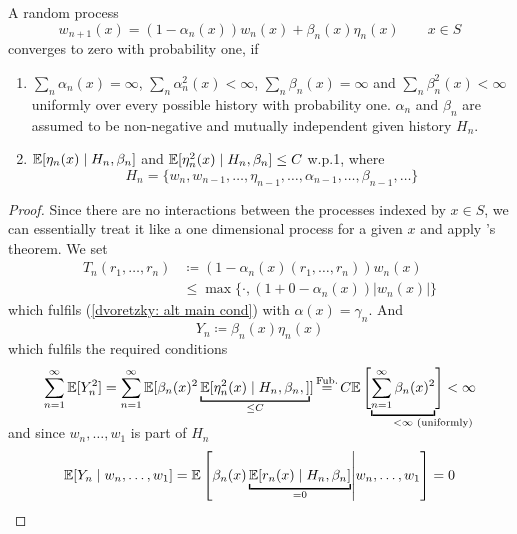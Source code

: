 \begin{lemma}
    A random process
    \[
        w_{n+1}(x)=(1-\alpha_n(x))w_n(x) +\beta_n(x)\eta_n(x) \qquad x\in S
    \]
    converges to zero with probability one, if 
    \begin{enumerate}
        \item \(\sum_n \alpha_n(x)=\infty\), \(\sum_n \alpha_n^2(x) <\infty\), \(\sum_n\beta_n(x)=\infty\) and \(\sum_n \beta_n^2 (x)<\infty\) uniformly over every possible history with probability one. \(\alpha_n\) and \(\beta_n\) are assumed to be non-negative and mutually independent given history \(H_n\).
        \item \(\mathbb{E}[\eta_n(x)\mid H_n, \beta_n]  \) and \( \mathbb{E}[\eta_n^2(x)\mid H_n,\beta_n]\le C \) w.p.1, where 
        \[
            H_n=\{w_n, w_{n-1}, \dots, \eta_{n-1}, \dots, \alpha_{n-1},\dots, \beta_{n-1},\dots\}
        \]
    \end{enumerate}
\end{lemma}
\begin{proof}
    Since there are no interactions between the processes indexed by \(x\in S\), we can essentially treat it like a one dimensional process for a given \(x\) and apply \citeauthor{dvoretzkyStochasticApproximation1956}'s theorem. 
    We set
    \begin{align}
        T_n(r_1,\dots, r_n)
        &\coloneqq (1-\alpha_n(x)(r_1,\dots,r_n)) w_n(x) \\
        &\le \max\{\cdot, (1+ 0 -\alpha_n(x))|w_n(x)|\}
    \end{align}
    which fulfils (\ref{dvoretzky: alt main cond}) with \(\alpha(x)=\gamma_n\). And
    \[
       Y_n\coloneqq \beta_n(x) \eta_n(x)
    \]
    which fulfils the required conditions
    \[
        \sum_{n=1}^\infty \E[Y_n^2] 
        = \sum_{n=1}^\infty \E[\beta_n(x)^2\underbracket[1pt]{\E[\eta_n^2(x)\mid H_n,\beta_n,]}_{\le C}]
        \xeq{\text{Fub.}} C \E\left[\vphantom{\sum_{n=1}^\infty}
            \smash{\underbracket[1pt]{
                \sum_{n=1}^\infty \beta_n(x)^2}_{
                <\infty \mathrlap{\text{ (uniformly)}}
                }}
        \right] <\infty
    \]
    and since \(w_n,\dots, w_1\) is part of \(H_n\) 
    \[
        \E[Y_n\mid w_n,\dots, w_1]=\E\left[\beta_n(x) \underbracket[1pt]{\E[r_n(x)\mid H_n, \beta_n]}_{\smash{=0}}   \middle| w_n,\dots, w_1\right]=0\qedhere
    \]
\end{proof}








\endinput